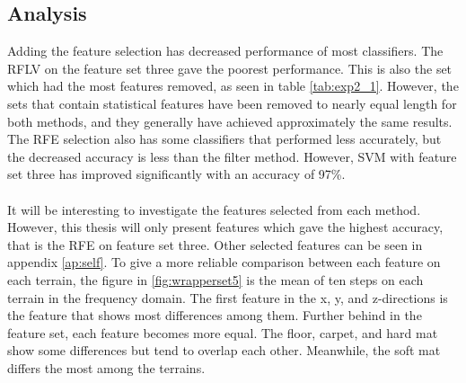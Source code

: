 \documentclass[USenglish]{ifimaster}  %
\begin{document}
\subsection{Analysis}
Adding the feature selection has decreased performance of most classifiers. The RFLV on the feature set three gave the poorest performance. This is also the set which had the most features removed, as seen in table \ref{tab:exp2_1}. However, the sets that contain statistical features have been removed to nearly equal length for both methods, and they generally have achieved approximately the same results. The RFE selection also has some classifiers that performed less accurately, but the decreased accuracy is less than the filter method. However, SVM with feature set three has improved significantly with an accuracy of 97\%.
\\
\\
It will be interesting to investigate the features selected from each method. However, this thesis will only present features which gave the highest accuracy, that is the RFE on feature set three. Other selected features can be seen in appendix \ref{ap:self}. To give a more reliable comparison between each feature on each terrain, the figure in \ref{fig:wrapperset5} is the mean of ten steps on each terrain in the frequency domain. The first feature in the x, y, and z-directions is the feature that shows most differences among them. Further behind in the feature set, each feature becomes more equal. The floor, carpet, and hard mat show some differences but tend to overlap each other. Meanwhile, the soft mat differs the most among the terrains.
\end{document}

